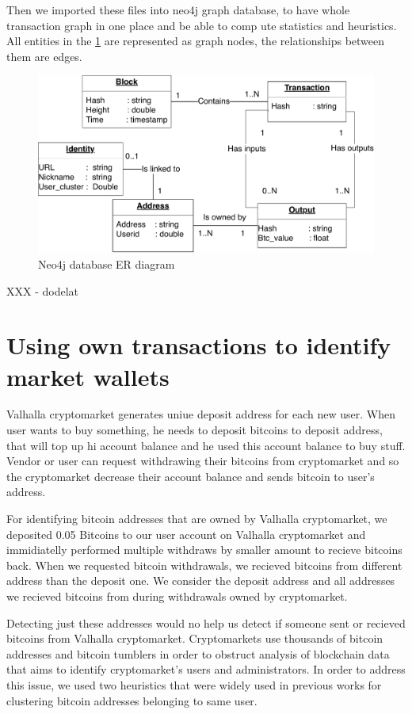 \documentclass[
  digital, %
  table,   %
  lof,     %
  lot,     %
  oneside
]{fithesis3}
\begin{document}
Then we imported these files into neo4j graph database, to have whole transaction graph in one place and be able to comp
ute statistics and heuristics.
All entities in the \ref{neo4jschema} are represented as graph nodes, the relationships between them are edges.
\begin{figure}[!htb]
    \centering
    \includegraphics[width=1\textwidth]{neo4j-schema}
    \caption{Neo4j database ER diagram}
    \label{neo4jschema}
\end{figure}
XXX - dodelat

\section{Using own transactions to identify market wallets}
\label{Using own transactions to identify market wallets}

Valhalla cryptomarket generates uniue deposit address for each new user.
When user wants to buy something, he needs to deposit bitcoins to deposit address,
that will top up hi account balance and he used this account balance to buy stuff.
Vendor or user can request withdrawing their bitcoins from cryptomarket and so
the cryptomarket decrease their account balance and sends bitcoin to user's address.

For identifying bitcoin addresses that are owned by Valhalla cryptomarket, we 
deposited 0.05 Bitcoins to our user account on Valhalla cryptomarket and immidiatelly
performed multiple withdraws by smaller amount to recieve bitcoins back.
When we requested bitcoin withdrawals, we recieved bitcoins from different address
than the deposit one. We consider the deposit address and all addresses we recieved
bitcoins from during withdrawals owned by cryptomarket.

Detecting just these addresses would no help us detect
if someone sent or recieved bitcoins from Valhalla cryptomarket.
Cryptomarkets use thousands of bitcoin addresses and
bitcoin tumblers in order to obstruct analysis of blockchain data
that aims to identify cryptomarket's users and administrators.
In order to address this issue, we used two heuristics that were widely used
in previous works \parencite{androulaki2013evaluating}\parencite{reid2013analysis}
for clustering bitcoin addresses belonging to same user.
\end{document}
